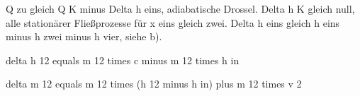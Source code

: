 Q zu gleich Q K minus Delta h eins, adiabatische Drossel. Delta h K gleich null, alle stationärer Fließprozesse für x eins gleich zwei. Delta h eins gleich h eins minus h zwei minus h vier, siehe b).

delta h 12 equals m 12 times c minus m 12 times h in

delta m 12 equals m 12 times (h 12 minus h in) plus m 12 times v 2
